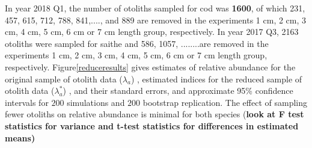 \documentclass[a4paper 12pt]{article}
\numberwithin{equation}{section}
\begin{document}
%
%


In year 2018 Q1, the number of otoliths sampled for cod was {\bf 1600}, of which 231, 457, 615, 712, 788, 841,...., and 889 are removed in the experiments 1 cm, 2 cm, 3 cm, 4 cm, 5 cm, 6 cm or 7 cm length group, respectively. In year 2017 Q3, 2163 otoliths were sampled for saithe and 586, 1057, ........are removed in the experiments 1 cm, 2 cm, 3 cm, 4 cm, 5 cm, 6 cm or 7 cm length group, respectively. Figure\ref{reduceresults} gives estimates of relative  abundance for the original sample of otolith data  ($\lambda_{a}$) , estimated indices for the reduced sample of otolith data  ($\lambda_{a}^{*}$) , and their standard errors, and approximate 95\% confidence intervals for  $200$ simulations and $200$ bootstrap replication. The effect of sampling fewer otoliths on relative abundance is minimal for both species {(\bf look at F test statistics for variance and t-test statistics for differences in estimated means)}

\end{document}
